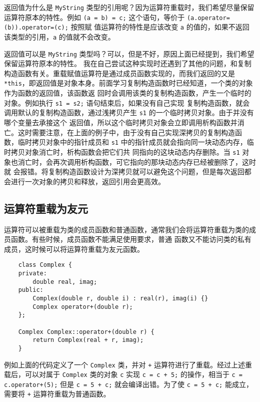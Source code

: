 \documentclass[UTF8]{ctexart}
\begin{document}
返回值为什么是 \texttt{MyString} 类型的引用呢？因为运算符重载时，我们希望尽量保留运算符原本的特性。例如
\texttt{(a = b) = c;} 这个语句，等价于 \texttt{(a.operator=(b)).operator=(c);} 按照赋
值运算符的特性是应该改变 \texttt{a} 的值的，如果不返回该类型的引用，\texttt{a} 的值就不会改变。

返回值可以是 \texttt{MyString} 类型吗？可以，但是不好，原因上面已经提到，我们希望保留运算符原本的特性。
我在自己尝试这种实现时还遇到了其他的问题，和复制构造函数有关。重载赋值运算符是通过成员函数实现的，而我们返回的又是
\texttt{*this}，即返回值是对象本身。前面学习复制构造函数时已经知道，一个类的对象作为函数的返回值，该函数返
回时会调用该类的复制构造函数，产生一个临时的对象。例如执行 \texttt{s1 = s2;} 语句结束后，如果没有自己实现
复制构造函数，就会调用默认的复制构造函数，通过浅拷贝产生 \texttt{s1} 的一个临时拷贝对象。由于并没有哪个变量去承接这个
返回值，所以这个临时拷贝对象会立即调用析构函数并消亡。这时需要注意，在上面的例子中，由于没有自己实现深拷贝的复制构造函
数，临时拷贝对象中的指针成员和 \texttt{s1} 中的指针成员就会指向同一块动态内存，临时拷贝对象消亡时，析构函数会把它们共
同指向的这块动态内存删除。当 \texttt{s1} 对象也消亡时，会再次调用析构函数，可它指向的那块动态内存已经被删除了，这时就
会报错。将复制构造函数设计为深拷贝就可以避免这个问题，但是每次返回都会进行一次对象的拷贝和释放，返回引用会更高效。

\subsection{运算符重载为友元}
运算符可以被重载为类的成员函数和普通函数，通常我们会将运算符重载为类的成员函数。有些时候，成员函数不能满足使用要求，普通
函数又不能访问类的私有成员，这时候可以将运算符重载为友元函数。

\begin{verbatim}
    class Complex {
    private:
        double real, imag;
    public:
        Complex(double r, double i) : real(r), imag(i) {}
        Complex operator+(double r);
    };

    Complex Complex::operator+(double r) {
        return Complex(real + r, imag);
    }
\end{verbatim}

例如上面的代码定义了一个 \texttt{Complex} 类，并对 \texttt{+} 运算符进行了重载。经过上述重载后，可以对属于
\texttt{Complex} 类的对象 \texttt{c} 实现 \texttt{c = c + 5;} 的操作，相当于
\texttt{c = c.operator+(5);} 但是 \texttt{c = 5 + c;} 就会编译出错。为了使
\texttt{c = 5 + c;} 能成立，需要将 \texttt{+} 运算符重载为普通函数。
\end{document}
